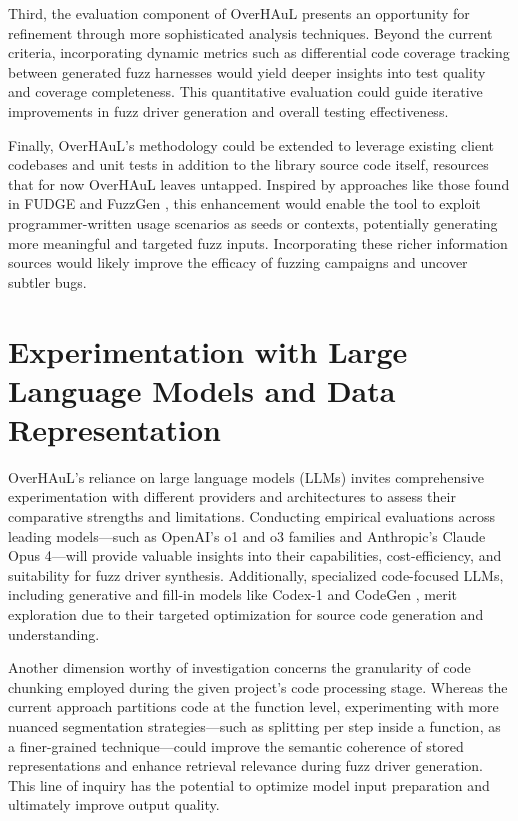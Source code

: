 \documentclass[
  a4paper,
  DIV=11,
  numbers=noendperiod]{scrreprt}
\theoremstyle{definition}
\theoremstyle{remark}
\begin{document}
Third, the evaluation component of OverHAuL presents an opportunity for
refinement through more sophisticated analysis techniques. Beyond the
current criteria, incorporating dynamic metrics such as differential
code coverage tracking between generated fuzz harnesses would yield
deeper insights into test quality and coverage completeness. This
quantitative evaluation could guide iterative improvements in fuzz
driver generation and overall testing effectiveness.

Finally, OverHAuL's methodology could be extended to leverage existing
client codebases and unit tests in addition to the library source code
itself, resources that for now OverHAuL leaves untapped. Inspired by
approaches like those found in FUDGE and FuzzGen
\autocite{fuzzgen,fudge}, this enhancement would enable the tool to
exploit programmer-written usage scenarios as seeds or contexts,
potentially generating more meaningful and targeted fuzz inputs.
Incorporating these richer information sources would likely improve the
efficacy of fuzzing campaigns and uncover subtler bugs.

\section{Experimentation with Large Language Models and Data
Representation}\label{experimentation-with-large-language-models-and-data-representation}

OverHAuL's reliance on large language models (LLMs) invites
comprehensive experimentation with different providers and architectures
to assess their comparative strengths and limitations. Conducting
empirical evaluations across leading models---such as OpenAI's o1 and o3
families and Anthropic's Claude Opus 4---will provide valuable insights
into their capabilities, cost-efficiency, and suitability for fuzz
driver synthesis. Additionally, specialized code-focused LLMs, including
generative and fill-in models like Codex-1 and CodeGen
\autocite{nijkamp2023a,nijkamp2023,openai2025a}, merit exploration due
to their targeted optimization for source code generation and
understanding.

Another dimension worthy of investigation concerns the granularity of
code chunking employed during the given project's code processing stage.
Whereas the current approach partitions code at the function level,
experimenting with more nuanced segmentation strategies---such as
splitting per step inside a function, as a finer-grained
technique---could improve the semantic coherence of stored
representations and enhance retrieval relevance during fuzz driver
generation. This line of inquiry has the potential to optimize model
input preparation and ultimately improve output quality.
\end{document}
